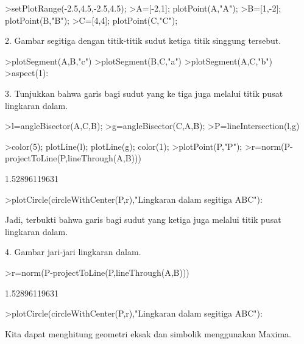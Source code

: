 \documentclass[a4paper,10pt]{article}
\begin{document}
\begin{eulernotebook}
\begin{eulercomment}
\begin{eulercomment}
\begin{eulerprompt}
>setPlotRange(-2.5,4.5,-2.5,4.5);
>A=[-2,1]; plotPoint(A,"A");
>B=[1,-2]; plotPoint(B,"B");
>C=[4,4]; plotPoint(C,"C");
\end{eulerprompt}
\begin{eulercomment}
2. Gambar segitiga dengan titik-titik sudut ketiga titik singgung
tersebut.
\end{eulercomment}
\begin{eulerprompt}
>plotSegment(A,B,"c")
>plotSegment(B,C,"a")
>plotSegment(A,C,"b")
>aspect(1):
\end{eulerprompt}
\begin{eulercomment}
3. Tunjukkan bahwa garis bagi sudut yang ke tiga juga melalui titik
pusat lingkaran dalam.
\end{eulercomment}
\begin{eulerprompt}
>l=angleBisector(A,C,B);
>g=angleBisector(C,A,B);
>P=lineIntersection(l,g)
\end{eulerprompt}
\begin{euleroutput}
  [0.581139,  0.581139]
\end{euleroutput}
\begin{eulerprompt}
>color(5); plotLine(l); plotLine(g); color(1);
>plotPoint(P,"P");
>r=norm(P-projectToLine(P,lineThrough(A,B)))
\end{eulerprompt}
\begin{euleroutput}
  1.52896119631
\end{euleroutput}
\begin{eulerprompt}
>plotCircle(circleWithCenter(P,r),"Lingkaran dalam segitiga ABC"):
\end{eulerprompt}
\begin{eulercomment}
Jadi, terbukti bahwa garis bagi sudut yang ketiga juga melalui titik
pusat lingkaran dalam.


4. Gambar jari-jari lingkaran dalam.
\end{eulercomment}
\begin{eulerprompt}
>r=norm(P-projectToLine(P,lineThrough(A,B)))
\end{eulerprompt}
\begin{euleroutput}
  1.52896119631
\end{euleroutput}
\begin{eulerprompt}
>plotCircle(circleWithCenter(P,r),"Lingkaran dalam segitiga ABC"):
\end{eulerprompt}
\begin{eulercomment}
Kita dapat menghitung geometri eksak dan simbolik menggunakan Maxima.


\end{eulercomment}
\end{eulercomment}
\end{eulercomment}
\end{eulernotebook}
\end{document}
